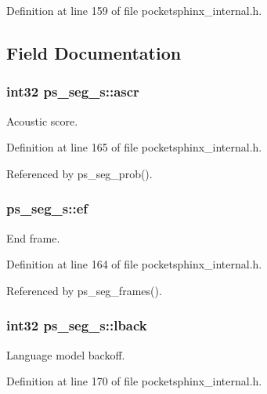 Definition at line 159 of file pocketsphinx\-\_\-internal.\-h.



\subsection{Field Documentation}
\subsubsection[{ascr}]{\setlength{\rightskip}{0pt plus 5cm}int32 ps\-\_\-seg\-\_\-s\-::ascr}\label{structps__seg__s_a6f7706ec4c0d0ec8ecafaf0f29f41f4b}


Acoustic score. 



Definition at line 165 of file pocketsphinx\-\_\-internal.\-h.



Referenced by ps\-\_\-seg\-\_\-prob().

\subsubsection[{ef}]{ ps\-\_\-seg\-\_\-s\-::ef}\label{structps__seg__s_ab25ecc6af8d2695c6097cf7e934eadd4}


End frame. 



Definition at line 164 of file pocketsphinx\-\_\-internal.\-h.



Referenced by ps\-\_\-seg\-\_\-frames().

\subsubsection[{lback}]{\setlength{\rightskip}{0pt plus 5cm}int32 ps\-\_\-seg\-\_\-s\-::lback}\label{structps__seg__s_a4d86c21f1ed2dc3eb3b1b1b37ce9bb48}


Language model backoff. 



Definition at line 170 of file pocketsphinx\-\_\-internal.\-h.




